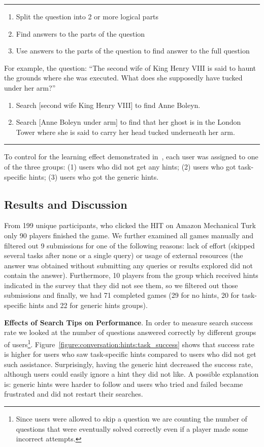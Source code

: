 \hrule
\begin{enumerate}[noitemsep]
\item Split the question into 2 or more logical parts
\item Find answers to the parts of the question
\item Use answers to the parts of the question to find answer to the full question
\end{enumerate}

For example, the question: ``The second wife of King Henry VIII is said to haunt the grounds where she was executed. What does she supposedly have tucked under her arm?''
\begin{enumerate}[noitemsep]
\item Search [second wife King Henry VIII] to find Anne Boleyn.
\item Search [Anne Boleyn under arm] to find that her ghost is in the London Tower where she is said to carry her head tucked underneath her arm.
\end{enumerate}
\hrule
\vspace{5mm}

To control for the learning effect demonstrated in~\cite{Moraveji:2011:MIU:2009916.2009966}, each user was assigned to one of the three groups: (1) users who did not get any hints; (2) users who got task-specific hints; (3) users who got the generic hints.


\subsection{Results and Discussion}
\label{section:conversation:hints:results}

From 199 unique participants, who clicked the HIT on Amazon Mechanical Turk only 90 players finished the game.
We further examined all games manually and filtered out 9 submissions for one of the following reasons: lack of effort (\eg skipped several tasks after none or a single query) or usage of external resources (\eg the answer was obtained without submitting any queries or results explored did not contain the answer).
Furthermore, 10 players from the group which received hints indicated in the survey that they did not see them, so we filtered out those submissions and finally, we had 71 completed games (29 for no hints, 20 for task-specific hints and 22 for generic hints groups).

\textbf{Effects of Search Tips on Performance}.
In order to measure search success rate we looked at the number of questions answered correctly by different groups of users\footnote{Since users were allowed to skip a question we are counting the number of questions that were eventually solved correctly even if a player made some incorrect attempts.}.
Figure~\ref{figure:conversation:hints:task_success} shows that success rate is higher for users who saw task-specific hints compared to users who did not get such assistance.
Surprisingly, having the generic hint decreased the success rate, although users could easily ignore a hint they did not like.
A possible explanation is: generic hints were harder to follow and users who tried and failed became frustrated and did not restart their searches.

